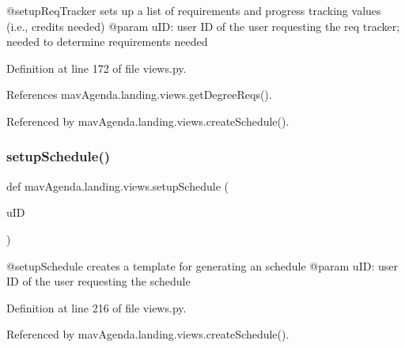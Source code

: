\begin{DoxyVerb}@setupReqTracker sets up a list of requirements and progress tracking values (i.e., credits needed)
@param uID: user ID of the user requesting the req tracker; needed to determine requirements needed
\end{DoxyVerb}
 

Definition at line 172 of file views.\+py.



References mav\+Agenda.\+landing.\+views.\+get\+Degree\+Reqs().



Referenced by mav\+Agenda.\+landing.\+views.\+create\+Schedule().

\mbox{\label{namespacemavAgenda_1_1landing_1_1views_a0917de5383aa4bc5f500a44777916555}} 
\subsubsection{\texorpdfstring{setup\+Schedule()}{setupSchedule()}}
{\footnotesize\ttfamily def mav\+Agenda.\+landing.\+views.\+setup\+Schedule (\begin{DoxyParamCaption}\item[{}]{u\+ID }\end{DoxyParamCaption})}

\begin{DoxyVerb}@setupSchedule creates a template for generating an schedule
@param uID: user ID of the user requesting the schedule
\end{DoxyVerb}
 

Definition at line 216 of file views.\+py.



Referenced by mav\+Agenda.\+landing.\+views.\+create\+Schedule().

\mbox{\label{namespacemavAgenda_1_1landing_1_1views_a7bbfe5d43d84d134720962c7f10d1ffd}} 
